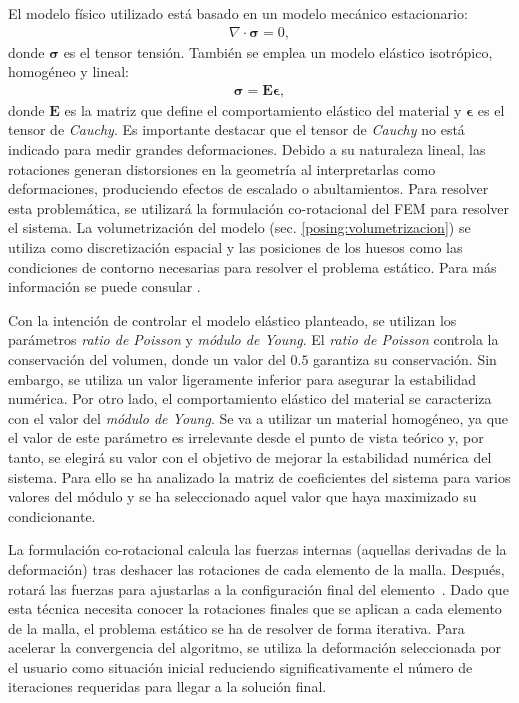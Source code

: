 
El modelo físico utilizado está basado en un modelo mecánico estacionario:
\begin{eqnarray}
\nabla \cdot \mathbf{\sigma} = 0,
\end{eqnarray}
donde $\mathbf{\sigma}$ es el tensor tensión. También\new{,} se emplea un modelo elástico isotrópico, homogéneo y lineal:  
\begin{eqnarray}
\mathbf{\sigma} = \mathbf{E}\mathbf{\epsilon}, 
\end{eqnarray}
donde $\mathbf{E}$ es la matriz que define el comportamiento elástico del material y $\mathbf{\epsilon}$ es el tensor de \emph{Cauchy}. Es importante destacar que el tensor de \emph{Cauchy} no está indicado para medir grandes deformaciones.  Debido a su naturaleza lineal, las rotaciones generan distorsiones en la geometría al interpretarlas como deformaciones, produciendo efectos de escalado o abultamientos. Para resolver esta problemática, se utilizará la formulación co-rotacional del \ac{FEM} para resolver el sistema. La volumetrización del modelo (sec. \ref{posing:volumetrizacion}) se utiliza como discretización espacial y las posiciones de los huesos como las condiciones de contorno necesarias para resolver el problema estático. Para más información se puede consular \cite{Muller2004}.

Con la intención de controlar el modelo elástico planteado, se utilizan los parámetros \emph{ratio de Poisson} y \emph {módulo de Young}. El \emph{ratio de Poisson} controla la conservación del volumen, donde un valor del $0.5$ garantiza su conservación. Sin embargo,  se utiliza un valor ligeramente inferior para asegurar la estabilidad numérica. 
Por otro lado, el comportamiento elástico del material se caracteriza con el valor del \emph {módulo de Young}. Se va a utilizar un material homogéneo, ya que el valor de este parámetro es irrelevante desde el punto de vista teórico y, por tanto, se elegirá su valor con el objetivo de mejorar la estabilidad numérica del sistema. 
Para ello\new{,} se ha analizado la matriz de coeficientes del sistema para varios valores del módulo y se ha seleccionado aquel valor que haya maximizado su condicionante.

La formulación co-rotacional calcula las fuerzas internas (aquellas derivadas de la deformación)\new{,} tras deshacer las rotaciones de cada elemento de la malla. Después, rotará las fuerzas para ajustarlas a la configuración final del elemento~\cite{Muller2004}. Dado que esta técnica necesita conocer la rotaciones finales que se aplican a cada elemento de la malla, el problema estático se ha de resolver de forma iterativa. Para acelerar la convergencia del algoritmo, se utiliza la deformación seleccionada por el usuario como situación inicial reduciendo  significativamente el número de iteraciones requeridas para llegar a la solución final.  %

